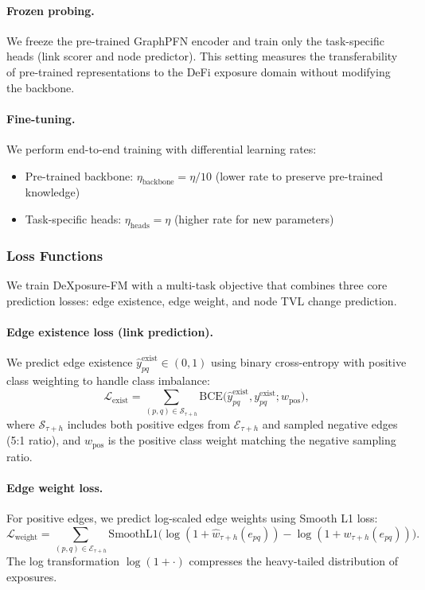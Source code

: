 \paragraph{Frozen probing.}
We freeze the pre-trained GraphPFN encoder and train only the task-specific heads (link scorer and node predictor). This setting measures the transferability of pre-trained representations to the DeFi exposure domain without modifying the backbone.

\paragraph{Fine-tuning.}
We perform end-to-end training with differential learning rates:
\begin{itemize}
  \item Pre-trained backbone: $\eta_{\text{backbone}} = \eta / 10$ (lower rate to preserve pre-trained knowledge)
  \item Task-specific heads: $\eta_{\text{heads}} = \eta$ (higher rate for new parameters)
\end{itemize}

\subsubsection{Loss Functions}
\label{sec:training:loss}

We train DeXposure-FM with a multi-task objective that combines three core prediction losses: edge existence, edge weight, and node TVL change prediction.

\paragraph{Edge existence loss (link prediction).}
We predict edge existence $\widehat{y}^{\mathrm{exist}}_{pq} \in (0,1)$ using binary cross-entropy with positive class weighting to handle class imbalance:
\begin{equation}
\mathcal L_{\mathrm{exist}} = \sum_{(p,q) \in \mathcal S_{\tau+h}} \mathrm{BCE}\bigl(\widehat{y}^{\mathrm{exist}}_{pq}, y^{\mathrm{exist}}_{pq}; w_{\mathrm{pos}}\bigr),
\label{eq:loss-exist}
\end{equation}
where $\mathcal S_{\tau+h}$ includes both positive edges from $\mathcal E_{\tau+h}$ and sampled negative edges (5:1 ratio), and $w_{\mathrm{pos}}$ is the positive class weight matching the negative sampling ratio.

\paragraph{Edge weight loss.}
For positive edges, we predict log-scaled edge weights using Smooth L1 loss:
\begin{equation}
\mathcal L_{\mathrm{weight}} = \sum_{(p,q) \in \mathcal E_{\tau+h}} \mathrm{SmoothL1}\bigl(\log(1+\widehat{w}_{\tau+h}(e_{pq})) - \log(1+w_{\tau+h}(e_{pq}))\bigr).
\label{eq:loss-weight}
\end{equation}
The log transformation $\log(1+\cdot)$ compresses the heavy-tailed distribution of exposures.

